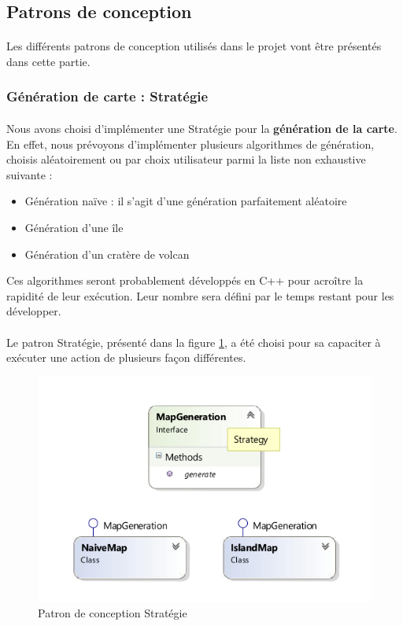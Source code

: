 \subsection{Patrons de conception}

\paragraph{}
Les différents patrons de conception utilisés dans le projet vont être présentés dans cette partie.

\subsubsection{Génération de carte : Stratégie}

\paragraph{}
Nous avons choisi d'implémenter une Stratégie pour la \textbf{génération de la carte}.
En effet, nous prévoyons d'implémenter plusieurs algorithmes de génération, choisis aléatoirement ou par choix utilisateur parmi la liste non exhaustive suivante :

\begin{itemize}
  \item Génération naïve : il s'agit d'une génération parfaitement aléatoire
  \item Génération d'une île
  \item Génération d'un cratère de volcan
\end{itemize}

Ces algorithmes seront probablement développés en C++ pour acroître la rapidité de leur exécution.
Leur nombre sera défini par le temps restant pour les développer.

\paragraph{}
Le patron Stratégie, présenté dans la figure \ref{fig:strategy}, a été choisi pour sa capaciter à exécuter une action de plusieurs façon différentes.

\begin{figure}[h]
  \centering
  \includegraphics[width=13cm]{schemas/dp_strategy.png}
  \caption{Patron de conception Stratégie}
  \label{fig:strategy}
\end{figure}

